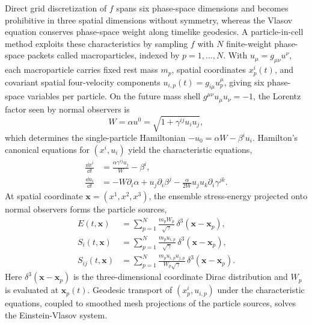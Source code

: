 Direct grid discretization of $f$ spans six phase-space dimensions and becomes prohibitive in three spatial dimensions without symmetry, whereas the Vlasov equation conserves phase-space weight along timelike geodesics. A particle-in-cell method \cite{1988csup.book.....H,1991ppcs.book.....B,Wu:2026nrpic} exploits these characteristics by sampling $f$ with $N$ finite-weight phase-space packets called macroparticles, indexed by $p = 1, \dots, N$. With $u_\mu = g_{\mu\nu} u^\nu$, each macroparticle carries fixed rest mass $m_p$, spatial coordinates $x_p^i(t)$, and covariant spatial four-velocity components $u_{i,p}(t) = g_{i\mu} u_p^\mu$, giving six phase-space variables per particle. On the future mass shell $g^{\mu\nu} u_\mu u_\nu = -1$, the Lorentz factor seen by normal observers is
\begin{equation}\label{eq:lorentz_factor}
W = \alpha u^0 = \sqrt{1 + \gamma^{ij} u_i u_j},
\end{equation}
which determines the single-particle Hamiltonian $-u_0 = \alpha W - \beta^i u_i$. Hamilton's canonical equations for $(x^i, u_i)$ yield the characteristic equations,
\begin{align}\label{eq:characteristics}
\frac{\dd x^i}{\dd t} &= \frac{\alpha \gamma^{ij} u_j}{W} - \beta^i, \nonumber\\
\frac{\dd u_i}{\dd t} &= -W \partial_i \alpha + u_j \partial_i \beta^j - \frac{\alpha}{2W} u_j u_k \partial_i \gamma^{jk}.
\end{align}
At spatial coordinate $\bm{x} = (x^1, x^2, x^3)$, the ensemble stress-energy projected onto normal observers forms the particle sources,
\begin{align}\label{eq:particle_sources}
E(t,\bm{x}) &= \sum_{p=1}^{N} \frac{m_p W_p}{\sqrt{\gamma}}\,\delta^3(\bm{x} - \bm{x}_p), \nonumber\\
S_i(t,\bm{x}) &= \sum_{p=1}^{N} \frac{m_p u_{i,p}}{\sqrt{\gamma}}\,\delta^3(\bm{x} - \bm{x}_p), \nonumber\\
S_{ij}(t,\bm{x}) &= \sum_{p=1}^{N} \frac{m_p u_{i,p} u_{j,p}}{W_p \sqrt{\gamma}}\,\delta^3(\bm{x} - \bm{x}_p).
\end{align}
Here $\delta^3(\bm{x} - \bm{x}_p)$ is the three-dimensional coordinate Dirac distribution and $W_p$ is evaluated at $\bm{x}_p(t)$. Geodesic transport of $(x_p^i, u_{i,p})$ under the characteristic equations, coupled to smoothed mesh projections of the particle sources, solves the Einstein-Vlasov system.
